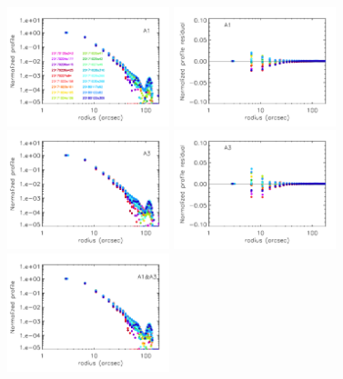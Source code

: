 \begin{figure}[ht!]
  \centering
   \includegraphics[clip, width=0.42\textwidth]{Figures/Beams/plot_profiles_a1.pdf}
   \includegraphics[clip, width=0.42\textwidth]{Figures/Beams/plot_profile_diff_wrt_median_a1.pdf}
   \includegraphics[clip, width=0.42\textwidth]{Figures/Beams/plot_profiles_a3.pdf}
   \includegraphics[clip, width=0.42\textwidth]{Figures/Beams/plot_profile_diff_wrt_median_a3.pdf}
   \includegraphics[clip, width=0.42\textwidth]{Figures/Beams/plot_profiles_1mm.pdf}

\end{figure}
